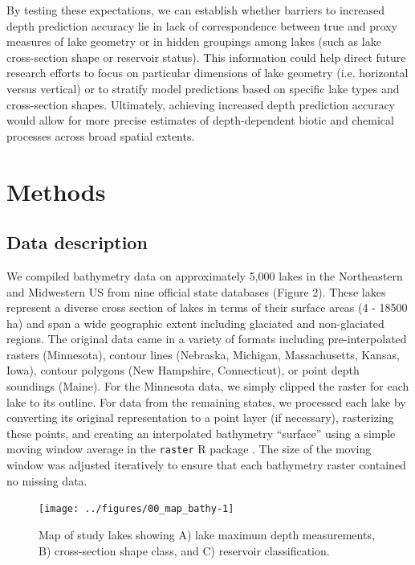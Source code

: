 \documentclass[draft]{agujournal2019}
\begin{document}
By testing these expectations, we can establish whether barriers to increased depth prediction accuracy lie in lack of correspondence between true and proxy measures of lake geometry or in hidden groupings among lakes (such as lake cross-section shape or reservoir status). This information could help direct future research efforts to focus on particular dimensions of lake geometry (i.e. horizontal versus vertical) or to stratify model predictions based on specific lake types and cross-section shapes. Ultimately, achieving increased depth prediction accuracy would allow for more precise estimates of depth-dependent biotic and chemical processes across broad spatial extents.

\section{Methods}
\subsection{Data description}
\noindent
We compiled bathymetry data on approximately 5,000 lakes in the Northeastern and Midwestern US from nine official state databases (Figure 2). These lakes represent a diverse cross section of lakes in terms of their surface areas (4 - 18500 ha) and span a wide geographic extent including glaciated and non-glaciated regions. The original data came in a variety of formats including pre-interpolated rasters (Minnesota), contour lines (Nebraska, Michigan, Massachusetts, Kansas, Iowa), contour polygons (New Hampshire, Connecticut), or point depth soundings (Maine). For the Minnesota data, we simply clipped the raster for each lake to its outline. For data from the remaining states, we processed each lake by converting its original representation to a point layer (if necessary), rasterizing these points, and creating an interpolated bathymetry “surface” using a simple moving window average in the \texttt{raster} R package \cite{hijmansRasterGeographicData2019}. The size of the moving window was adjusted iteratively to ensure that each bathymetry raster contained no missing data.

\begin{figure}
      \begin{center}\texttt{[image: ../figures/00\_map\_bathy-1]}\end{center}
      \caption{Map of study lakes showing A) lake maximum depth measurements, B) cross-section shape class, and C) reservoir classification.}\label{fig2}
      \end{figure}
\end{document}
